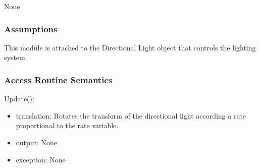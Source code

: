 \documentclass[12pt]{article}
\begin{document}
{None

\subsubsection* {Assumptions}

This module is attached to the Directional Light object that controls the lighting system.

\subsubsection* {Access Routine Semantics}

\noindent Update():
\begin{itemize}
\item translation: Rotates the transform of the directional light according a rate proportional to the rate variable.
\item output: None
\item exception: None
\end{itemize} }

\newpage
\end{document}
